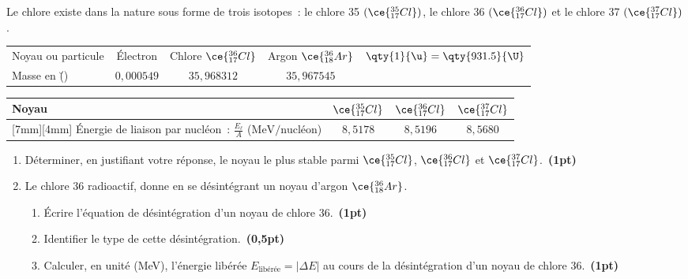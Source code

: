 Le chlore existe dans la nature sous forme de trois isotopes~: le chlore 35
$(\ce{_{17}^{35}Cl})$, le chlore 36 $(\ce{_{17}^{36}Cl})$ et le chlore 37
$(\ce{_{17}^{37}Cl})$.

\begin{donnees}
    \begin{table}[H]
        \centering
        \setlength{\arrayrulewidth}{0.8pt}
        \renewcommand{\arraystretch}{1.3}
        \begin{tabularx}{\textwidth}{|p{4cm}|C|C|C|p{4cm}|}
            \hline
            Noyau ou particule & Électron & Chlore $\ce{_{17}^{36}Cl}$ &
            Argon $\ce{_{18}^{36}Ar}$ &
             \\
            Masse en (\unit{\u}) & $0,000549$ & $35,968312$ & $35,967545$ & \\
            \hline
        \end{tabularx}
        \begin{tabularx}{\textwidth}{|p{10cm}|C|C|C|}
            \hline
            Noyau & $\ce{_{17}^{35}Cl}$ & $\ce{_{17}^{36}Cl}$ & 
            $\ce{_{17}^{37}Cl}$ \\
            \hline
            \raisebox{0mm}[7mm][4mm]{
                Énergie de liaison par nucléon~:
                $\frac{E_{\ell}}{A}$ ($\unit{\MeV\per\mathrm{nucléon}}$)} &
            $8,5178$ & $8,5196$ & $8,5680$ \\
            \hline
        \end{tabularx}
    \end{table}
\end{donnees}

\begin{enumerate}
    \item Déterminer, en justifiant votre réponse, le noyau le plus stable parmi
          $\ce{_{17}^{35}Cl}$, $\ce{_{17}^{36}Cl}$ et
          $\ce{_{17}^{37}Cl}$.~\textbf{(1pt)}

    \item Le chlore 36 radioactif, donne en se désintégrant un noyau d'argon
          $\ce{_{18}^{36}Ar}$.
          \begin{enumerate}
              \item Écrire l'équation de désintégration d'un noyau de chlore
                    36.~\textbf{(1pt)}
              \item Identifier le type de cette désintégration.~\textbf{(0,5pt)}
              \item Calculer, en unité (\unit{\MeV}), l'énergie libérée
                    $E_{\text{libérée}}=|\Delta E|$ au cours de la
                    désintégration d'un noyau de chlore 36.~\textbf{(1pt)}
          \end{enumerate}
\end{enumerate}

